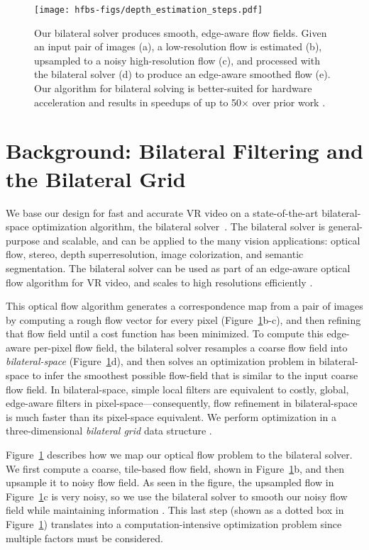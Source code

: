 \begin{figure}
  \centering
  \texttt{[image: hfbs-figs/depth\_estimation\_steps.pdf]}
  \caption{Our bilateral solver produces smooth, edge-aware flow fields.  Given an input pair of images (a), a low-resolution flow is estimated (b),  upsampled to a noisy high-resolution flow (c), and processed with the bilateral solver (d)  to produce an edge-aware smoothed flow (e). Our algorithm for bilateral solving is better-suited for hardware acceleration and results in speedups of up to 50$\times$ over prior work \cite{googlejump, BarronPoole2016}.}
  \label{fig:teaser}
\end{figure}

\section{Background: Bilateral Filtering and the Bilateral Grid}

\label{sec:hfbs-background}

We base our design for fast and accurate VR video on a state-of-the-art bilateral-space optimization algorithm, the bilateral solver~\cite{BarronPoole2016}.
The bilateral solver is general-purpose and scalable, and can be applied to the many vision applications: optical flow, stereo, depth superresolution, image colorization, and semantic segmentation.
The bilateral solver can be used as part of an edge-aware optical flow algorithm for VR video, and scales to high resolutions efficiently \cite{googlejump}.

This optical flow algorithm generates a correspondence map from a pair of images by computing a rough flow vector for every pixel (Figure~\ref{fig:teaser}b-c), and then refining that flow field until a cost function has been minimized.
To compute this edge-aware per-pixel flow field, the bilateral solver resamples a coarse flow field into \emph{bilateral-space} (Figure~\ref{fig:teaser}d), and then solves an optimization problem in bilateral-space to infer the smoothest possible flow-field that is similar to the input coarse flow field.
In bilateral-space, simple local filters are equivalent to costly, global, edge-aware filters in pixel-space---consequently, flow refinement in bilateral-space is much faster than its pixel-space equivalent.
We perform optimization in a three-dimensional \emph{bilateral grid} data structure \cite{Chen2007}.

Figure~\ref{fig:teaser} describes how we map our optical flow problem to the bilateral solver. We first compute a coarse, tile-based flow field, shown in Figure~\ref{fig:teaser}b, and then upsample it to noisy flow field. As seen in the figure, the upsampled flow in Figure~\ref{fig:teaser}c is very noisy, so we use the bilateral solver to smooth our noisy flow field while maintaining information . This last step (shown as a dotted box in Figure~\ref{fig:teaser}) translates into a computation-intensive optimization problem since multiple factors must be considered.

